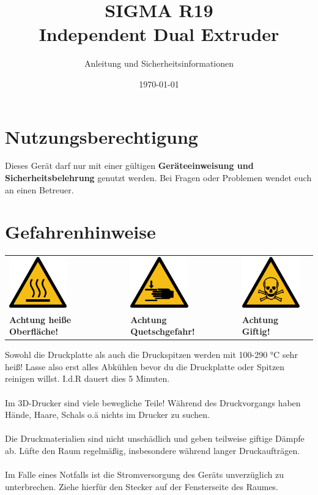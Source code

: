 \documentclass[a4paper]{article}
\begin{document}
\author{Anleitung und Sicherheitsinformationen} %
\title{SIGMA R19 \\ Independent Dual Extruder}
\date{\today{}} %
\maketitle{} %
\section{Nutzungsberechtigung}
Dieses Gerät darf nur mit einer gültigen \textbf{Geräteeinweisung und Sicherheitsbelehrung} genutzt werden. Bei Fragen oder Problemen wendet euch an einen Betreuer.
\section{Gefahrenhinweise}
\begin{center}
	\begin{tabular}{C{5cm}C{5cm}C{5cm}}
		\includegraphics[width=2.5cm]{hot-surface.png} & \includegraphics[width=2.5cm]{hand-injury.png} & \includegraphics[width=2.5cm]{toxic.png}\\
		\textbf{Achtung heiße Oberfläche!} & \textbf{Achtung Quetschgefahr!} & \textbf{Achtung Giftig!}
	\end{tabular}
\end{center}

		
 Sowohl die Druckplatte als auch die Druckspitzen werden mit 100-290 °C sehr heiß!
 Lasse also erst alles Abkühlen bevor du die Druckplatte oder Spitzen reinigen willst.
 I.d.R dauert dies 5 Minuten.\\\\
Im 3D-Drucker sind viele bewegliche Teile! Während des Druckvorgangs haben Hände, Haare, Schals o.ä nichts im Drucker zu suchen.\\\\
Die Druckmaterialien sind nicht unschädlich und geben teilweise giftige Dämpfe ab. Lüfte den Raum regelmäßig, insbesondere während langer Druckaufträgen.\\\\
Im Falle eines Notfalls ist die Stromversorgung des Geräts unverzüglich zu unterbrechen. Ziehe hierfür den Stecker auf der Fensterseite des Raumes.
\end{document}
